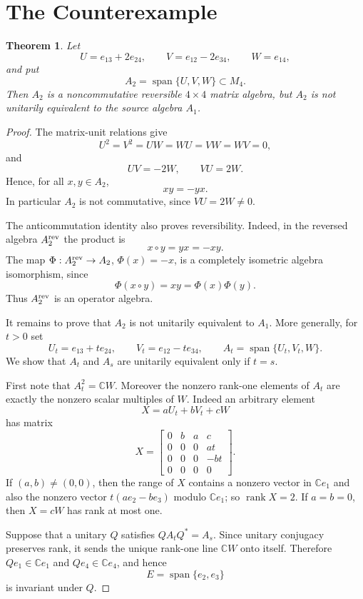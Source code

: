 \documentclass[11pt]{article}
\newtheorem{theorem}{Theorem}
\newcommand{\C}{\mathbb C}
\newcommand{\spn}{\operatorname{span}}
\newcommand{\rank}{\operatorname{rank}}
\begin{document}
\section*{The Counterexample}

\begin{theorem}
Let
\[
   U=e_{13}+2e_{24},\qquad
   V=e_{12}-2e_{34},\qquad
   W=e_{14},
\]
and put
\[
   A_2=\spn\{U,V,W\}\subset M_4.
\]
Then \(A_2\) is a noncommutative reversible \(4\times4\) matrix algebra, but
\(A_2\) is not unitarily equivalent to the source algebra \(A_1\).
\end{theorem}

\begin{proof}
The matrix-unit relations give
\[
   U^2=V^2=UW=WU=VW=WV=0,
\]
and
\[
   UV=-2W,\qquad VU=2W.
\]
Hence, for all \(x,y\in A_2\),
\[
   xy=-yx.
\]
In particular \(A_2\) is not commutative, since \(VU=2W\neq0\).

The anticommutation identity also proves reversibility.  Indeed, in the
reversed algebra \(A_2^{\rm rev}\) the product is
\[
   x\circ y=yx=-xy.
\]
The map \(\Phi:A_2^{\rm rev}\to A_2\), \(\Phi(x)=-x\), is a completely
isometric algebra isomorphism, since
\[
   \Phi(x\circ y)=xy=\Phi(x)\Phi(y).
\]
Thus \(A_2^{\rm rev}\) is an operator algebra.

It remains to prove that \(A_2\) is not unitarily equivalent to \(A_1\).  More
generally, for \(t>0\) set
\[
   U_t=e_{13}+t e_{24},\qquad
   V_t=e_{12}-t e_{34},\qquad
   A_t=\spn\{U_t,V_t,W\}.
\]
We show that \(A_t\) and \(A_s\) are unitarily equivalent only if \(t=s\).

First note that \(A_t^2=\C W\).  Moreover the nonzero rank-one elements of
\(A_t\) are exactly the nonzero scalar multiples of \(W\).  Indeed an arbitrary
element
\[
   X=aU_t+bV_t+cW
\]
has matrix
\[
X=
\begin{bmatrix}
0&b&a&c\\
0&0&0&at\\
0&0&0&-bt\\
0&0&0&0
\end{bmatrix}.
\]
If \((a,b)\neq(0,0)\), then the range of \(X\) contains a nonzero vector in
\(\C e_1\) and also the nonzero vector \(t(ae_2-be_3)\) modulo \(\C e_1\);
so \(\rank X=2\).  If \(a=b=0\), then \(X=cW\) has rank at most one.

Suppose that a unitary \(Q\) satisfies \(QA_tQ^*=A_s\).  Since unitary
conjugacy preserves rank, it sends the unique rank-one line \(\C W\) onto
itself.  Therefore \(Qe_1\in\C e_1\) and \(Qe_4\in\C e_4\), and hence
\[
   E=\spn\{e_2,e_3\}
\]
is invariant under \(Q\).


\end{proof}
\end{document}
